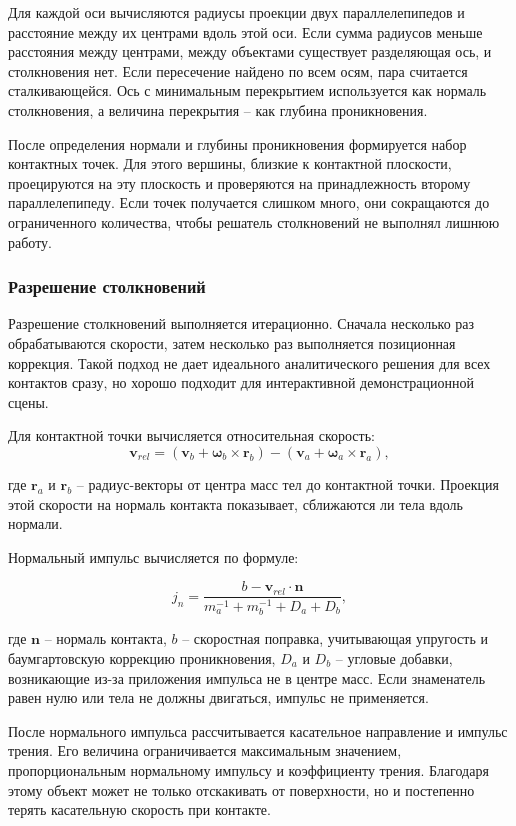 Для каждой оси вычисляются радиусы проекции двух параллелепипедов и расстояние
между их центрами вдоль этой оси. Если сумма радиусов меньше расстояния между
центрами, между объектами существует разделяющая ось, и столкновения нет. Если
пересечение найдено по всем осям, пара считается сталкивающейся. Ось с минимальным
перекрытием используется как нормаль столкновения, а величина перекрытия -- как
глубина проникновения.

После определения нормали и глубины проникновения формируется набор контактных
точек. Для этого вершины, близкие к контактной плоскости, проецируются на эту
плоскость и проверяются на принадлежность второму параллелепипеду. Если точек
получается слишком много, они сокращаются до ограниченного количества, чтобы
решатель столкновений не выполнял лишнюю работу.

\subsubsection{Разрешение столкновений}

Разрешение столкновений выполняется итерационно. Сначала несколько раз
обрабатываются скорости, затем несколько раз выполняется позиционная коррекция.
Такой подход не дает идеального аналитического решения для всех контактов сразу,
но хорошо подходит для интерактивной демонстрационной сцены.

Для контактной точки вычисляется относительная скорость:
\[
\mathbf{v}_{rel}=(\mathbf{v}_b+\boldsymbol{\omega}_b\times\mathbf{r}_b)-
(\mathbf{v}_a+\boldsymbol{\omega}_a\times\mathbf{r}_a),
\]

где \(\mathbf{r}_a\) и \(\mathbf{r}_b\) -- радиус-векторы от центра масс тел до
контактной точки. Проекция этой скорости на нормаль контакта показывает,
сближаются ли тела вдоль нормали.

Нормальный импульс вычисляется по формуле:

\[
j_n=\frac{b-\mathbf{v}_{rel}\cdot\mathbf{n}}
{m_a^{-1}+m_b^{-1}+D_a+D_b},
\]

где \(\mathbf{n}\) -- нормаль контакта, \(b\) -- скоростная поправка, учитывающая
упругость и баумгартовскую коррекцию проникновения, \(D_a\) и \(D_b\) --
угловые добавки, возникающие из-за приложения импульса не в центре масс.
Если знаменатель равен нулю или тела не должны двигаться, импульс не применяется.

После нормального импульса рассчитывается касательное направление и импульс
трения. Его величина ограничивается максимальным значением, пропорциональным
нормальному импульсу и коэффициенту трения. Благодаря этому объект может не
только отскакивать от поверхности, но и постепенно терять касательную скорость
при контакте.

